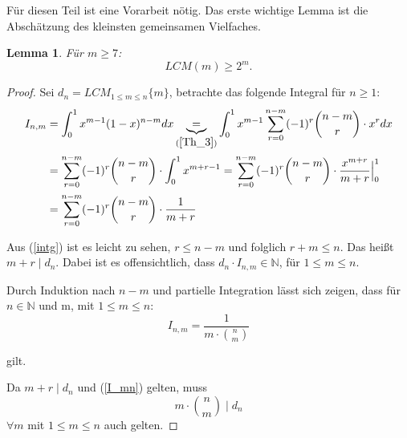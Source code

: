 \documentclass[12pt,oneside]{article}
\newtheorem{lemma}[theorem]{Lemma}
\theoremstyle{remark}
\theoremstyle{definition}
\begin{document}
Für diesen Teil ist eine Vorarbeit nötig. Das erste wichtige Lemma ist die Abschätzung des kleinsten gemeinsamen Vielfaches.


\begin{lemma}\label{lemma_1}
Für $m \geq 7$:\newline
\begin{equation}
    LCM(m) \geq 2^m.  
\end{equation}
\end{lemma}

\begin{proof}
Sei $d_{n} = LCM_{1 \leq m \leq n}{\{m\}}$, betrachte das folgende Integral für $n \geq 1$:\newline
\begin{equation}\label{intg}
    \begin{split}
      \begin{aligned}
        I_{n,m}&= \int_{0}^{1} x^{m-1} (1-x)^{n - m} dx \underbrace{=}_{(\ref{Th_3})} \int_{0}^{1} x^{m-1} \sum_{r = 0}^{n - m} (-1)^r {n - m\choose r} \cdot x^r dx \\
        &= \sum_{r = 0}^{n - m}(-1)^r {n - m \choose r} \cdot \int_{0}^{1} x^{m + r - 1} 
        = \sum_{r = 0}^{n - m} (-1)^r {n - m \choose r} \cdot \frac{x^{m+r}}{m+r}\Big|_0^1\\
        &= \sum_{r = 0}^{n - m} (-1)^r {n - m \choose r} \cdot \frac{1}{m + r}
      \end{aligned}
    \end{split}
\end{equation}

Aus (\ref{intg}) ist es leicht zu sehen, $r \leq n - m $ und folglich $ r + m \leq n $. Das heißt $m + r \mid d_{n}$. Dabei ist es offensichtlich, dass $d_{n} \cdot I_{n,m} \in \mathbb{N}$, für $1 \leq m \leq n$.

Durch Induktion nach $n - m$ und partielle Integration lässt sich zeigen, dass für $n \in \mathbb{N}$ und m, mit $1 \leq m \leq n$:
\begin{equation}\label{I_mn}
    I_{n,m} = \frac{1}{m \cdot {n \choose m}}
\end{equation}

gilt.\newline\newline


Da $m + r \mid d_{n} $ und (\ref{I_mn}) gelten, muss
\begin{equation}
    m \cdot {n \choose m} \mid d_{n}
\end{equation}
$\forall m $ mit $1 \leq m \leq n $ auch gelten.\newline


\end{proof}
\end{document}
